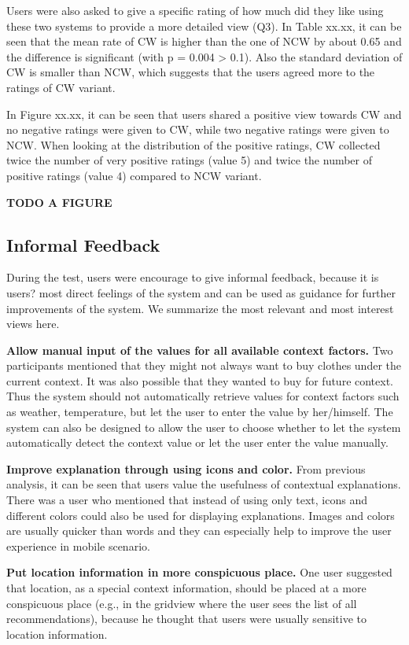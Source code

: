 Users were also asked to give a specific rating of how much did they like using these two systems to provide a more detailed view (Q3). In Table xx.xx, it can be seen that the mean rate of CW is higher than the one of NCW by about 0.65 and the difference is significant (with p = 0.004 > 0.1). Also the standard deviation of CW is smaller than NCW, which suggests that the users agreed more to the ratings of CW variant.

In Figure xx.xx, it can be seen that users shared a positive view towards CW and no negative ratings were given to CW, while two negative ratings were given to NCW. When looking at the distribution of the positive ratings, CW collected twice the number of very positive ratings (value 5) and twice the number of positive ratings (value 4) compared to NCW variant. 

\textbf{TODO A FIGURE}

\subsection{Informal Feedback} \label{sec:results_if}

During the test, users were encourage to give informal feedback, because it is users? most direct feelings of the system and can be used as guidance for further improvements of the system. We summarize the most relevant and most interest views here.

\textbf{Allow manual input of the values for all available context factors.} Two participants mentioned that they might not always want to buy clothes under the current context. It was also possible that they wanted to buy for future context. Thus the system should not automatically retrieve values for context factors such as weather, temperature, but let the user to enter the value by her/himself. The system can also be designed to allow the user to choose whether to let the system automatically detect the context value or let the user enter the value manually.

\textbf{Improve explanation through using icons and color.} From previous analysis, it can be seen that users value the usefulness of contextual explanations. There was a user who mentioned that instead of using only text, icons and different colors could also be used for displaying explanations. Images and colors are usually quicker than words and they can especially help to improve the user experience in mobile scenario.
 
\textbf{Put location information in more conspicuous place.} One user suggested that location, as a special context information, should be placed at a more conspicuous place (e.g., in the gridview where the user sees the list of all recommendations), because he thought that users were usually sensitive to location information.  

